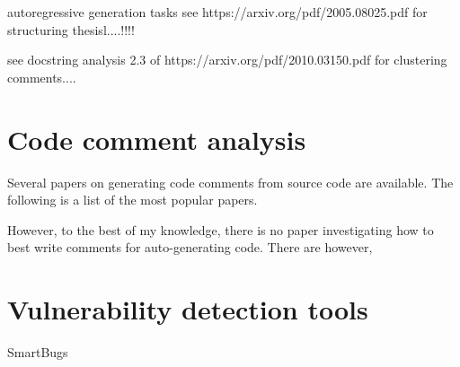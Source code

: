 
autoregressive generation tasks
see https://arxiv.org/pdf/2005.08025.pdf for structuring thesisl....!!!!

see docstring analysis 2.3 of https://arxiv.org/pdf/2010.03150.pdf for clustering comments....


\section{Code comment analysis}
\label{sec:code-comment-analysis}

Several papers on generating code comments from source code are available. The following is a list of the most popular papers.

However, to the best of my knowledge, there is no paper investigating how to best write comments for auto-generating code. There are however, 


\section{Vulnerability detection tools}
\label{sec:vulnerability-detection-tools}
SmartBugs


